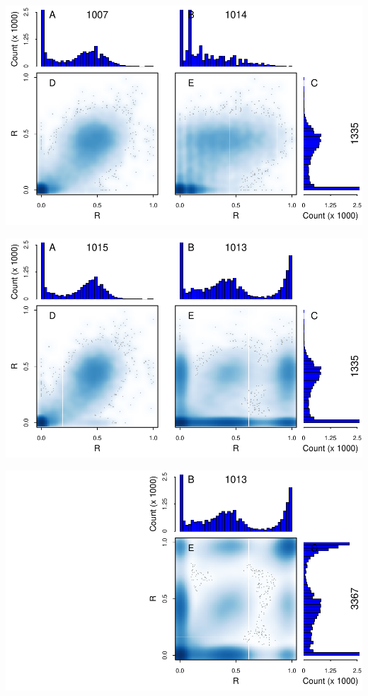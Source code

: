 \documentclass{article}\usepackage[]{graphicx}\usepackage[]{color}
\begin{document}
\noindent\includegraphics{Fig1-mscat-figs/mscat-1-4-7.pdf}

\noindent\includegraphics{Fig1-mscat-figs/mscat-5-3-7.pdf}

\noindent\includegraphics{Fig1-mscat-figs/mscat-null-3-6.pdf}
\end{document}
